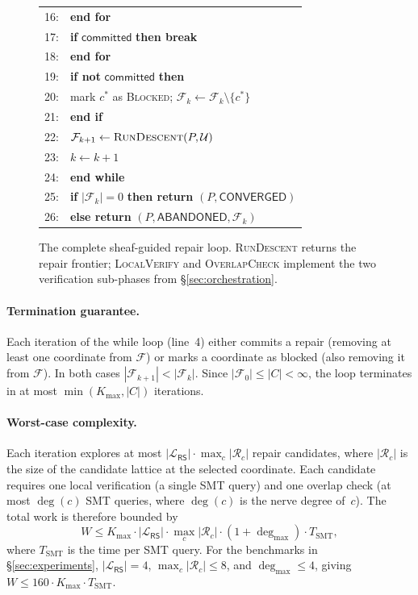 \documentclass[11pt]{article}
\newcommand{\RF}{\mathcal{F}}               %
\newcommand{\RS}{\mathsf{RS}}               %
\begin{document}
\begin{figure}[H]
{{\begin{tabular}{@{}r@{\;}l}
16: & \quad\quad \textbf{end for}\\
17: & \quad\quad \textbf{if} $\mathsf{committed}$ \textbf{then break}\\
18: & \quad \textbf{end for}\\
19: & \quad \textbf{if not} $\mathsf{committed}$ \textbf{then}\\
20: & \quad\quad mark $c^*$ as \textsc{Blocked}; \;
     $\RF_k \gets \RF_k \setminus \{c^*\}$\\
21: & \quad \textbf{end if}\\
22: & \quad $\RF_{k+1} \gets \textsc{RunDescent}(P, \mathcal{U})$\\
23: & \quad $k \gets k + 1$\\
24: & \textbf{end while}\\
25: & \textbf{if} $|\RF_k| = 0$ \textbf{then return} $(P, \mathsf{CONVERGED})$\\
26: & \textbf{else return} $(P, \mathsf{ABANDONED}, \RF_k)$\\
\end{tabular}
}}
\caption{The complete sheaf-guided repair loop.  \textsc{RunDescent} returns
  the repair frontier; \textsc{LocalVerify} and \textsc{OverlapCheck}
  implement the two verification sub-phases from \S\ref{sec:orchestration}.}
\label{alg:repair-loop}
\end{figure}

\paragraph{Termination guarantee.}
Each iteration of the while loop (line~4) either commits a repair
(removing at least one coordinate from $\RF$) or marks a coordinate as
blocked (also removing it from $\RF$).  In both cases $|\RF_{k+1}| <
|\RF_k|$.  Since $|\RF_0| \leq |C| < \infty$, the loop terminates in
at most $\min(K_{\max}, |C|)$ iterations.

\paragraph{Worst-case complexity.}
Each iteration explores at most $|\mathcal{L}_\RS| \cdot \max_c |\mathcal{R}_c|$
repair candidates, where $|\mathcal{R}_c|$ is the size of the candidate
lattice at the selected coordinate.  Each candidate requires one local
verification (a single SMT query) and one overlap check (at most
$\deg(c)$ SMT queries, where $\deg(c)$ is the nerve degree of~$c$).
The total work is therefore bounded by
\[
  W \leq K_{\max} \cdot |\mathcal{L}_\RS| \cdot
  \max_c |\mathcal{R}_c| \cdot (1 + \deg_{\max})
  \cdot T_{\mathrm{SMT}},
\]
where $T_{\mathrm{SMT}}$ is the time per SMT query.  For the benchmarks
in \S\ref{sec:experiments}, $|\mathcal{L}_\RS| = 4$,
$\max_c |\mathcal{R}_c| \leq 8$, and $\deg_{\max} \leq 4$, giving
$W \leq 160 \cdot K_{\max} \cdot T_{\mathrm{SMT}}$.
\end{document}
